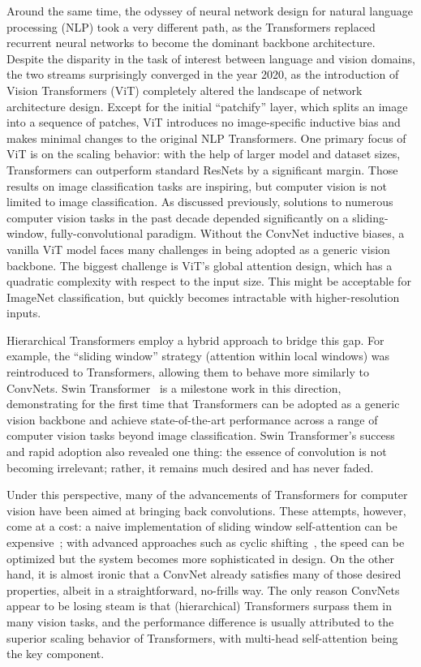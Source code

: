 Around the same time, the odyssey of neural network design for natural language processing (NLP) took a very different path, as the Transformers replaced recurrent neural networks to become the dominant backbone architecture. Despite the disparity in the task of interest between language and vision domains, the two streams surprisingly converged in the year 2020, as the introduction of Vision Transformers (ViT) completely altered the landscape of network architecture design. Except for the initial ``patchify'' layer, which splits an image into a sequence of patches, ViT introduces no image-specific inductive bias and makes minimal changes to the original NLP Transformers. One primary focus of ViT is on the scaling behavior: with the help of larger model and dataset sizes, Transformers can outperform standard ResNets by a significant margin. Those results on image classification tasks are inspiring, but computer vision is not limited to image classification. As discussed previously, solutions to numerous computer vision tasks in the past decade depended significantly on a sliding-window, fully-convolutional paradigm. Without the ConvNet inductive biases, a vanilla ViT model faces many challenges in being adopted as a generic vision backbone. The biggest challenge is ViT's global attention design, which has a quadratic complexity with respect to the input size. This might be acceptable for ImageNet classification, but quickly becomes intractable with higher-resolution inputs. 

Hierarchical Transformers employ a hybrid approach to bridge this gap. For example, the ``sliding window'' strategy (\eg attention within local windows) was reintroduced to Transformers, allowing them to behave more similarly to ConvNets. Swin Transformer~\cite{Liu2021swin} is a milestone work in this direction, demonstrating for the first time that Transformers can be adopted as a generic vision backbone and achieve state-of-the-art performance across a range of computer vision tasks beyond image classification. Swin Transformer's success and rapid adoption also revealed one thing: the essence of convolution is not becoming irrelevant; rather, it remains much desired and has never faded. 


Under this perspective, many of the advancements of Transformers for computer vision have been aimed at bringing back convolutions. These attempts, however, come at a cost: a naive implementation of sliding window self-attention can be expensive~\cite{ramachandran2019stand}; with advanced approaches such as cyclic shifting~\cite{Liu2021swin}, the speed can be optimized but the system becomes more sophisticated in design. 
On the other hand, it is almost ironic that a ConvNet already satisfies many of those desired properties, albeit in a straightforward, no-frills way. The only reason ConvNets appear to be losing steam is that (hierarchical) Transformers surpass them in many vision tasks, and the performance difference is usually attributed to the superior scaling behavior of Transformers, with multi-head self-attention being the key component. 

